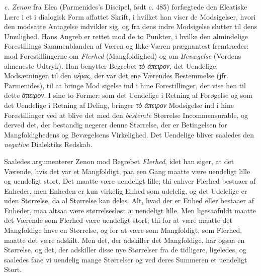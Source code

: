 \documentclass[12pt,a4paper]{book}
\newcommand{\gk}[1]{\textit{#1}}
\begin{document}
\textit{c.} \emph{Zenon} fra Elea (Parmenides's Discipel, født c. 485)
forfægtede den Eleatiske Lære i et i dialogisk Form affattet
Skrift, i hvilket han viser de Modsigelser, hvori den modsatte
Antagelse indvikler sig, og fra dens indre Modsigelse slutter
til dens Umulighed. Hans Angreb er rettet mod de to Punkter,
i hvilke den almindelige Forestillings Sammenblanden af Væren
og Ikke-Væren prægnantest fremtræder: mod Forestillingerne
om \emph{Flerhed} (Mangfoldighed) og om \emph{Bevægelse} (Vordens
almeneste Udtryk). Han benytter Begrebet \gk{τὸ ἄπειρον}, det
Uendelige, Modsætningen til den \gk{πέρας}, der var det ene
Værendes Bestemmelse (jfr. Parmenides), til at bringe Mod\-%
sigelse ind i hine Forestillinger, der vise hen til dette \gk{ἄπειρον}.
I sine to Former: som det Uendelige i Retning af Forøgelse
og som det Uendelige i Retning af Deling, bringer \gk{τὸ ἄπειρον}
Modsigelse ind i hine Forestillinger ved at blive det med den
%
%
%
\emph{bestemte} Størrelse Incommensurable, og derved det, der
bestandig negerer denne Størrelse, der er Betingelsen for
Mangfoldighedens og Bevægelsens Virkelighed. Det Uendelige
bliver saaledes den \emph{negative} Dialektiks Redskab.

Saaledes argumenterer Zenon mod Begrebet \emph{Flerhed},
idet han siger, at det Værende, hvis det var et Mangfoldigt,
paa een Gang maatte være uendeligt lille og uendeligt stort.
Det maatte være uendeligt lille; thi enhver Flerhed bestaaer
af Enheder, men Enheden er kun virkelig Enhed som udelelig,
og det Udelelige er uden Størrelse, da al Størrelse kan deles.
Alt, hvad der er Enhed eller bestaaer af Enheder, maa altsaa
være størrelsesløst ɔ: uendeligt lille. Men ligesaafuldt maatte
det Værende som Flerhed være uendeligt stort; thi for at være
maatte det Mangfoldige have en Størrelse, og for at være som
Mangfoldigt, som Flerhed, maatte det være adskilt. Men det,
der adskiller det Mangfoldige, har ogsaa en Størrelse, og det,
der adskiller disse nye Størrelser fra de tidligere, ligeledes,
og saaledes faae vi uendelig mange Størrelser og ved deres
Summeren et uendeligt Stort.
\end{document}
